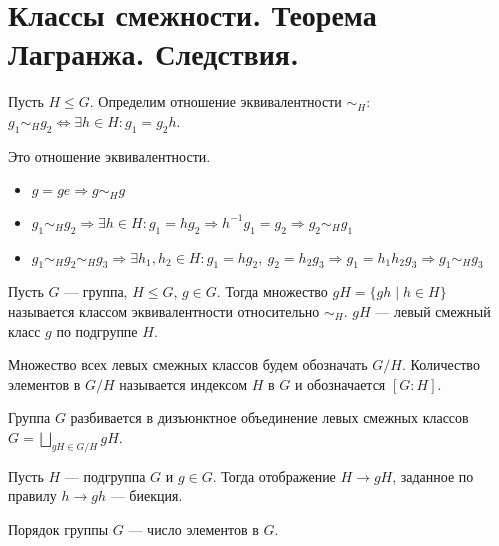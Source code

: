 % 
% 
\section{Классы смежности. Теорема Лагранжа. Следствия.}
\begin{defn}
    Пусть $ H \le G$. Определим отношение эквивалентности $ \sim_H$:  $ g_1 \sim_H g_2 \Longleftrightarrow \exists h \in H\colon g_1 = g_2h$.
    \begin{com}
        Это отношение эквивалентности.
	\begin{itemize}[noitemsep]
	    \item $ g = ge \Longrightarrow g \sim _H g $
	    \item $ g_1 \sim _H g_2 \Longrightarrow  \exists  h \in H\colon g_1 = hg_2 \Longrightarrow h^{-1}g_1 = g_2 \Longrightarrow g_2 \sim _H g_1 $
	    \item $ g_1 \sim _H g_2 \sim _H g_3\Longrightarrow  \exists  h_1, h_2 \in H\colon g_1 = hg_2, ~g_2 = h_2g_3 \Longrightarrow g_1 = h_1h_2g_3 \Longrightarrow g_1 \sim _H g_3 $
        \end{itemize}
    \end{com}
\end{defn}
\begin{defn}
    Пусть $ G$ --- группа, $ H \le G$, $ g \in G$. Тогда множество $ gH = \{gh \mid h \in  H\}$ называется {\sf классом эквивалентности относительно $ \sim _H$}. $ gH$ ---  {\sf левый смежный класс} $ g$ по подгруппе  $ H$.    
\end{defn}
\begin{defn}[Индекс]
    Множество всех левых смежных классов будем обозначать $ G / H$. Количество элементов в  $ G /H$ называется  {\sf индексом} $ H$ в  $ G$ и обозначается  $ [G : H]$.  
\end{defn}
\begin{cor}
    Группа $ G$ разбивается в дизъюнктное объединение левых смежных классов
    $
    G = \bigsqcup_{gH \in  G/H} gH
    $.
\end{cor}
\begin{st}
    Пусть $ H$ --- подгруппа  $ G$ и  $ g \in G$. Тогда отображение $ H \to  gH$, заданное по правилу $ h \to  gh$ --- биекция.
\end{st}
\begin{defn}
    {\sf Порядок группы } $ G$ --- число элементов в  $ G$.
\end{defn}
